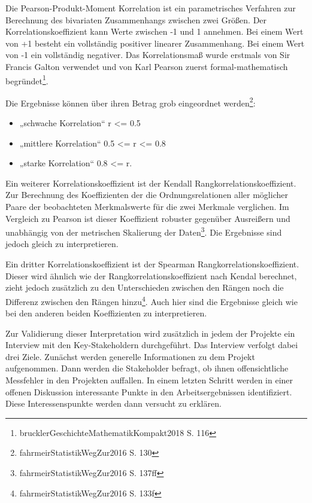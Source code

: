 Die Pearson-Produkt-Moment Korrelation ist ein parametrisches Verfahren
zur Berechnung des bivariaten Zusammenhangs zwischen zwei Größen. Der
Korrelationskoeffizient kann Werte zwischen -1 und 1 annehmen. Bei einem
Wert von +1 besteht ein vollständig positiver linearer Zusammenhang. Bei
einem Wert von -1 ein vollständig negativer. Das Korrelationsmaß wurde
erstmals von Sir Francis Galton verwendet und von Karl Pearson zuerst
formal-mathematisch begründet\footnote{brucklerGeschichteMathematikKompakt2018
S. 116}.

Die Ergebnisse können über ihren Betrag grob eingeordnet
werden\footnote{fahrmeirStatistikWegZur2016 S. 130}:

\begin{itemize}
\item
    „schwache Korrelation`` r <= 0.5
\item
    „mittlere Korrelation`` 0.5 <= r <= 0.8
\item
    „starke Korrelation`` 0.8 <= r.
\end{itemize}

Ein weiterer Korrelationskoeffizient ist der Kendall
Rangkorrelationskoeffizient. Zur Berechnung des Koeffizienten der die
Ordnungsrelationen aller möglicher Paare der beobachteten Merkmalswerte
für die zwei Merkmale verglichen. Im Vergleich zu Pearson ist dieser
Koeffizient robuster gegenüber Ausreißern und unabhängig von der
metrischen Skalierung der Daten\footnote{fahrmeirStatistikWegZur2016 S.
  137ff}. Die Ergebnisse sind jedoch gleich zu interpretieren.

Ein dritter Korrelationskoeffizient ist der Spearman
Rangkorrelationskoeffizient. Dieser wird ähnlich wie der
Rangkorrelationskoeffizient nach Kendal berechnet, zieht jedoch
zusätzlich zu den Unterschieden zwischen den Rängen noch die Differenz
zwischen den Rängen hinzu\footnote{fahrmeirStatistikWegZur2016 S. 133f}.
Auch hier sind die Ergebnisse gleich wie bei den anderen beiden
Koeffizienten zu interpretieren.

Zur Validierung dieser Interpretation wird zusätzlich in jedem der
Projekte ein Interview mit den Key-Stakeholdern durchgeführt. Das
Interview verfolgt dabei drei Ziele. Zunächst werden generelle
Informationen zu dem Projekt aufgenommen. Dann werden die Stakeholder
befragt, ob ihnen offensichtliche Messfehler in den Projekten auffallen.
In einem letzten Schritt werden in einer offenen Diskussion interessante
Punkte in den Arbeitsergebnissen identifiziert. Diese Interessenspunkte
werden dann versucht zu erklären.

